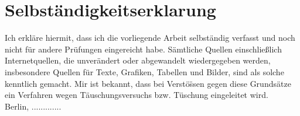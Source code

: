 \chapter*{Selbst\"andigkeitserklarung}


Ich erkl\"are hiermit, dass ich die vorliegende Arbeit selbst\"andig verfasst und 
noch nicht für andere Pr\"ufungen eingereicht habe. S\"amtliche Quellen 
einschließlich Internetquellen, die unver\"andert oder abgewandelt wiedergegeben 
werden, insbesondere Quellen für Texte, Grafiken, Tabellen und Bilder, sind als 
solche kenntlich gemacht. Mir ist bekannt, dass bei Verst\"o\"ssen gegen diese 
Grunds\"atze ein Verfahren wegen T\"auschungsversuchs bzw. T\"uschung eingeleitet 
wird.\\[3cm]
Berlin, .............